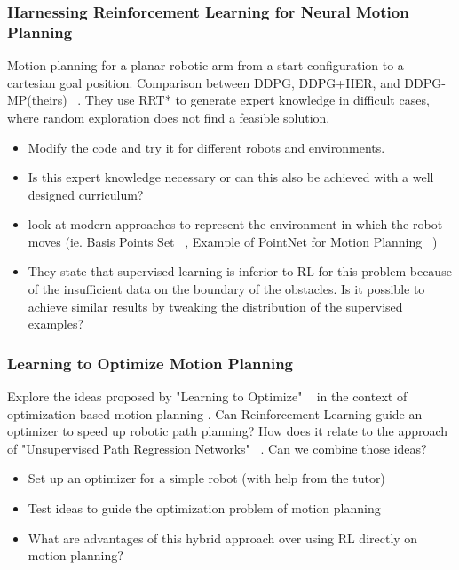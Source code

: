 \documentclass[a4paper]{article}
\begin{document}
\subsubsection{Harnessing Reinforcement Learning for Neural Motion Planning}
Motion planning for a planar robotic arm from a start configuration to a cartesian goal position.
Comparison between DDPG, DDPG+HER, and DDPG-MP(theirs) ~\cite{Jurgenson2019}.
They use RRT* to generate expert knowledge in difficult cases, where random exploration does not find a feasible solution.
\begin{itemize}
  \item Modify the code and try it for different robots and environments.
  \item Is this expert knowledge necessary or can this also be achieved with a well designed curriculum?
  \item look at modern approaches to represent the environment in which the robot moves (ie. Basis Points Set ~\cite{Prokudin2019}, Example of PointNet for Motion Planning ~\cite{Strudel2020})
  \item They state that supervised learning is inferior to RL for this problem because of the insufficient data on the boundary of the obstacles. Is it possible to achieve similar results by tweaking the distribution of the supervised examples?
\end{itemize}


\subsubsection{Learning to Optimize Motion Planning}
Explore the ideas proposed by "Learning to Optimize" ~\cite{LiM16b} in the context of optimization based motion planning \cite{Zucker2013}.
Can Reinforcement Learning guide an optimizer to speed up robotic path planning?
How does it relate to the approach of "Unsupervised Path Regression Networks" ~\cite{Pandy2020}.
Can we combine those ideas?

\begin{itemize}
  \item Set up an optimizer for a simple robot (with help from the tutor)
  \item Test ideas to guide the optimization problem of motion planning
  \item What are advantages of this hybrid approach over using RL directly on motion planning?
\end{itemize}
\end{document}
